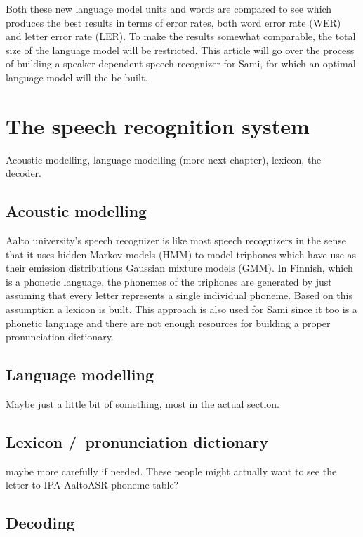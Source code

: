 \documentclass[10pt,b5paper]{article}
\begin{document}
Both these new language model units and words are compared to see which produces the best results in terms of error rates, both word error rate (WER) and letter error rate (LER). To make the results somewhat comparable, the total size of the language model will be restricted. This article will go over the process of building a speaker-dependent speech recognizer for Sami, for which an optimal language model will the be built.

\section{The speech recognition system}

Acoustic modelling, language modelling (more next chapter), lexicon, the decoder.


\subsection{Acoustic modelling}

Aalto university's speech recognizer is like most speech recognizers in the sense that it uses hidden Markov models (HMM) to model triphones which have use as their emission distributions Gaussian mixture models (GMM). In Finnish, which is a phonetic language, the phonemes of the triphones are generated by just assuming that every letter represents a single individual phoneme. Based on this assumption a lexicon is built. This approach is also used for Sami since it too is a phonetic language and there are not enough resources for building a proper pronunciation dictionary. 

\subsection{Language modelling}

Maybe just a little bit of something, most in the actual section.

\subsection{Lexicon /\ pronunciation dictionary}

maybe more carefully if needed. These people might actually want to see the letter-to-IPA-AaltoASR phoneme table?

\subsection{Decoding}
\end{document}
